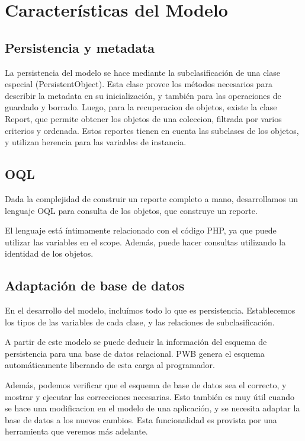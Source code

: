 \section{Características del Modelo}

\subsection{Persistencia y metadata}
\label{sub-pers}
La persistencia del modelo se hace mediante la subclasificación de una clase especial (PersistentObject).
Esta clase provee los métodos necesarios para describir la metadata en su inicialización, y también para las
operaciones de guardado y borrado.
Luego, para la recuperacion de objetos, existe la clase Report, que permite obtener los objetos de una
coleccion, filtrada por varios criterios y ordenada. Estos reportes tienen en cuenta las subclases de los
objetos, y utilizan herencia para las variables de instancia.

\subsection{OQL}
\label{sub-oql}
Dada la complejidad de construir un reporte completo a mano, desarrollamos un lenguaje OQL para consulta de
los objetos, que construye un reporte.

El lenguaje está íntimamente relacionado con el código PHP, ya que puede utilizar las variables en el scope.
Además, puede hacer consultas utilizando la identidad de los objetos.

\subsection{Adaptación de base de datos}
\label{sub-adapt}
En el desarrollo del modelo, incluímos todo lo que es persistencia. Establecemos los tipos de las variables
de cada clase, y las relaciones de subclasificación.

A partir de este modelo se puede deducir la información del esquema de persistencia para una base de datos relacional.
PWB genera el esquema automáticamente liberando de esta carga al programador.

Además, podemos verificar que el esquema de base de datos sea el correcto, y mostrar y ejecutar las correcciones
necesarias. Esto también es muy útil cuando se hace una modificacion en el modelo de una aplicación, y se necesita
adaptar la base de datos a los nuevos cambios. Esta funcionalidad es provista por una herramienta que veremos más adelante.

